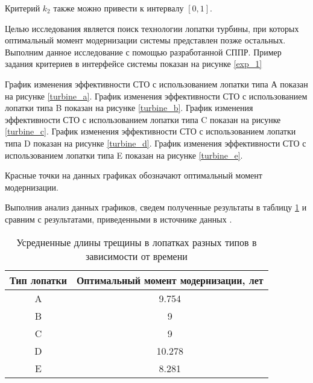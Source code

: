 Критерий $k_2$ также можно привести к интервалу $[0,1]$.

Целью исследования является поиск технологии лопатки турбины, при которых оптимальный момент модернизации системы представлен позже остальных.
Выполним данное исследование с помощью разработанной СППР.
Пример задания критериев в интерфейсе системы показан на рисунке \ref{exp_1}


График изменения эффективности СТО с использованием лопатки типа А показан на рисунке \ref{turbine_a}.
График изменения эффективности СТО с использованием лопатки типа B показан на рисунке \ref{turbine_b}.
График изменения эффективности СТО с использованием лопатки типа C показан на рисунке \ref{turbine_c}.
График изменения эффективности СТО с использованием лопатки типа D показан на рисунке \ref{turbine_d}.
График изменения эффективности СТО с использованием лопатки типа E показан на рисунке \ref{turbine_e}.


Красные точки на данных графиках обозначают оптимальный момент модернизации.

Выполнив анализ данных графиков, сведем полученные результаты в таблицу \ref{table:turbine_results} и сравним с результатами, приведенными в источнике данных \cite{Degradation}.

\begin{table}[H]
    \centering
    \caption{Усредненные длины трещины в лопатках разных типов в зависимости от времени}\label{table:turbine_results}
    \begin{tabular}{|c|c|}
    \hline Тип лопатки & Оптимальный момент модернизации, лет \\
    \hline A & 9.754 \\
    \hline B & 9 \\
    \hline C & 9 \\
    \hline D & 10.278 \\
    \hline E & 8.281 \\
    \hline
    \end{tabular}
\end{table}

